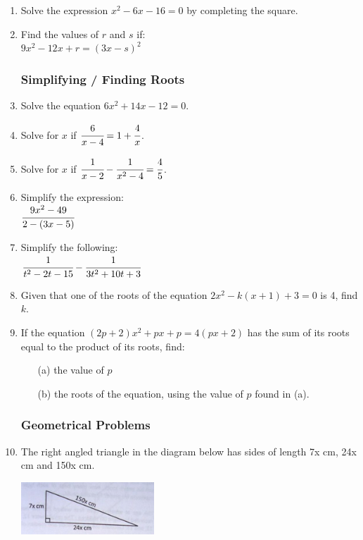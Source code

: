 \begin{enumerate}
	\item Solve the expression $x^2 - 6x - 16 = 0$ by completing the square.
	
	\item Find the values of $r$ and $s$ if:\\
	$9x^2 - 12x + r = (3x - s)^2$
	

			\subsubsection{Simplifying / Finding Roots}
	\item Solve the equation $6x^2 + 14x - 12 = 0$.
	
	\item Solve for $x$ if $\cfrac{6}{x - 4} = 1 + \cfrac{4}{x}$.
			
	\item Solve for $x$ if $\cfrac{1}{x - 2} - \cfrac{1}{x^2 - 4} = \cfrac{4}{5}$.
	
	\item Simplify the expression:\\
	$\cfrac{9x^2 - 49}{2 - (3x - 5)}$
	
	\item Simplify the following:\\
	$\cfrac{1}{t^2 - 2t - 15} - \cfrac{1}{3t^2 + 10t + 3}$
	
	
	\item Given that one of the roots of the equation $2x^2 - k(x + 1) + 3 = 0$ is 4, find $k$.
	
	\item If the equation $(2p + 2)x^2 + px + p = 4(px + 2)$ has the sum of its roots equal to the product of its roots, find:
		\begin{itemize}
		\item[(a)] the value of $p$
		\item[(b)] the roots of the equation, using the value of $p$ found in (a).
		\end{itemize}
		
		
		\subsubsection{Geometrical Problems} \label{f2quadeqnsgeo}
	\item The right angled triangle in the diagram below has sides of length 7x cm, 24x cm and 150x cm.
	\begin{center}
	\includegraphics[width=5cm]{./img/quad1.jpg}
	\end{center}
	

\end{enumerate}
